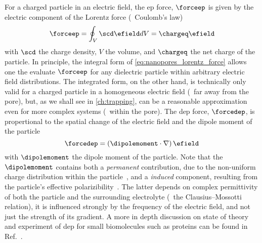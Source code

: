 For a charged particle in an electric field, the \gls{ep} force, $\forceep$ is given by the electric component
of the Lorentz force (\ie~Coulomb's law)~\cite{Lu-2012}
%
\begin{equation}\label{eq:nanopores_lorentz_force}
  \forceep = \oint_{V} \scd \efield dV = \chargeq \efield 
\end{equation}
%
with $\scd$ the charge density, $V$ the volume, and $\chargeq$ the net charge of the particle. In principle,
the integral form of \cref{eq:nanopores_lorentz_force} allows one the evaluate $\forceep$ for any dielectric
particle within arbitrary electric field distributions. The integrated form, on the other hand, is technically
only valid for a charged particle in a homogeneous electric field (\ie~far away from the pore), but, as we
shall see in \cref{ch:trapping}, can be a reasonable approximation even for more complex systems (\ie~within
the pore). The \gls{dep} force, $\forcedep$, is propertional to the spatial change of the electric field and
the dipole moment of the particle~\cite{Hoelzel-2020}
%
\begin{equation}\label{eq:nanopores_dep_force}
  \forcedep = \left( \dipolemoment \cdot \nabla \right) \efield 
\end{equation}
%
with $\dipolemoment$ the dipole moment of the particle. Note that the $\dipolemoment$ contains both a
\emph{permanent} contribution, due to the non-uniform charge distribution within the
particle~\cite{Hoelzel-2020,VanMeervelt-2017}, and a \emph{induced} component, resulting from the particle's
effective polarizibility~\cite{Minerick-2015}. The latter depends on complex permittivity of both the particle
and the surrounding electrolyte (\ie~the Clausius–Mossotti relation), it is influenced strongly by the
frequency of the electric field, and not just the strength of its gradient. A more in depth discussion on
state of theory and experiment of \gls{dep} for small biomolecules such as proteins can be found in
Ref.~\cite{Hoelzel-2020}.

